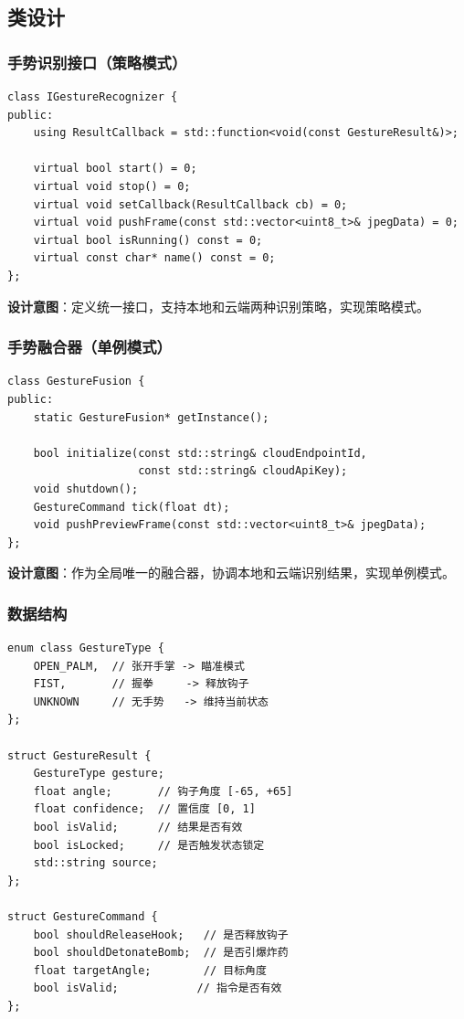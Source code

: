 \documentclass{article}
\begin{document}
\subsection{类设计}

\subsubsection{手势识别接口（策略模式）}

\begin{lstlisting}[caption=IGestureRecognizer 接口]
class IGestureRecognizer {
public:
    using ResultCallback = std::function<void(const GestureResult&)>;
    
    virtual bool start() = 0;
    virtual void stop() = 0;
    virtual void setCallback(ResultCallback cb) = 0;
    virtual void pushFrame(const std::vector<uint8_t>& jpegData) = 0;
    virtual bool isRunning() const = 0;
    virtual const char* name() const = 0;
};
\end{lstlisting}

\textbf{设计意图}：定义统一接口，支持本地和云端两种识别策略，实现策略模式。

\subsubsection{手势融合器（单例模式）}

\begin{lstlisting}[caption=GestureFusion 融合器]
class GestureFusion {
public:
    static GestureFusion* getInstance();
    
    bool initialize(const std::string& cloudEndpointId, 
                    const std::string& cloudApiKey);
    void shutdown();
    GestureCommand tick(float dt);
    void pushPreviewFrame(const std::vector<uint8_t>& jpegData);
};
\end{lstlisting}

\textbf{设计意图}：作为全局唯一的融合器，协调本地和云端识别结果，实现单例模式。

\subsubsection{数据结构}

\begin{lstlisting}[caption=手势数据结构]
enum class GestureType {
    OPEN_PALM,  // 张开手掌 -> 瞄准模式
    FIST,       // 握拳     -> 释放钩子
    UNKNOWN     // 无手势   -> 维持当前状态
};

struct GestureResult {
    GestureType gesture;
    float angle;       // 钩子角度 [-65, +65]
    float confidence;  // 置信度 [0, 1]
    bool isValid;      // 结果是否有效
    bool isLocked;     // 是否触发状态锁定
    std::string source;
};

struct GestureCommand {
    bool shouldReleaseHook;   // 是否释放钩子
    bool shouldDetonateBomb;  // 是否引爆炸药
    float targetAngle;        // 目标角度
    bool isValid;            // 指令是否有效
};
\end{lstlisting}
\end{document}
